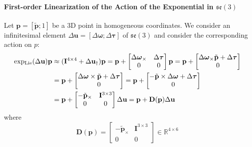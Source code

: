 \paragraph{First-order Linearization of the Action of the Exponential in $\mathfrak{se}(3)$}
Let $\mathbf{p}=[\tilde{\mathbf{p}};1]$ be a 3D point in homogeneous coordinates. We consider an infinitesimal element $\Delta \mathbf{u}=[\Delta \boldsymbol{\omega};\Delta \boldsymbol{\tau}]$ of $\mathfrak{se}(3)$ and consider the corresponding action on $p$:
\begin{equation}
\begin{split}
\operatorname{exp_{Lie}}(\Delta \mathbf{u})\mathbf{p} &\approx (\mathbf{I}^{4\times4}+\Delta \mathbf{u}_\dagger)\mathbf{p} = \mathbf{p} +
\begin{bmatrix}
\Delta \boldsymbol{\omega}_\times & \Delta \boldsymbol{\tau} \\
0  & 0
\end{bmatrix} \mathbf{p}
= \mathbf{p} +
\begin{bmatrix}
\Delta \boldsymbol{\omega}_\times \tilde{\mathbf{p}}+\Delta \boldsymbol{\tau} \\
0
\end{bmatrix} \\
&= \mathbf{p} +
\begin{bmatrix}
\Delta \boldsymbol{\omega} \times \tilde{\mathbf{p}}+\Delta \boldsymbol{\tau} \\
0
\end{bmatrix}
= \mathbf{p} +
\begin{bmatrix}
-\tilde{\mathbf{p}} \times \Delta \boldsymbol{\omega} + \Delta \boldsymbol{\tau} \\
0
\end{bmatrix} \\
&= \mathbf{p} +
\begin{bmatrix}
-\tilde{\mathbf{p}}_\times & \mathbf{I}^{3\times3} \\
0 & 0
\end{bmatrix} \Delta \mathbf{u}
= \mathbf{p} + \mathbf{D}(\mathbf{p})\Delta \mathbf{u}
\end{split}
\end{equation}
where
\begin{equation}
\mathbf{D}(\mathbf{p}) = 
\begin{bmatrix}
-\tilde{\mathbf{p}}_\times & \mathbf{I}^{3\times3} \\
0 & 0
\end{bmatrix} \in \mathbb{R}^{4\times6}
\end{equation}


